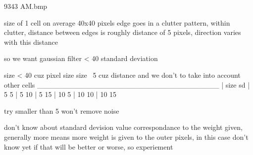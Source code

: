 9343 AM.bmp

size of 1 cell on average 40x40 pixels
edge goes in a clutter pattern, within clutter, distance between edges is roughly distance of 5 pixels, direction varies with this distance

so we want gaussian filter < 40
standard deviation 


size < 40 cuz pixel size
size ~5 cuz distance and we don't to take into account other cells
___________________________________
| size          sd
|  5            5
|  5            10
|  5            15
|  10           5
|  10           10
|  10           15

try smaller than 5 won't remove noise

don't know about standard devision value correspondance to the weight given, generally more means more weight is given to the outer pixels, in this case don't know yet if that will be better or worse, so experiement
